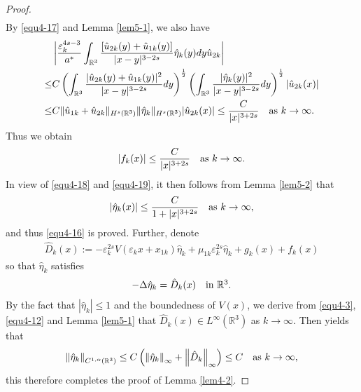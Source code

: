 \documentclass[reqno, 11pt]{amsart} %
\numberwithin{equation}{section}
\begin{document}
\begin{proof}
\begin{equation*}
\begin{split}
			\end{split}
		\end{equation*}
		By \eqref{equ4-17} and Lemma \ref{lem5-1}, we also have
		\begin{equation*}
			\begin{split}
				&	\left| \frac{\varepsilon_{k}^{4s-3}}{a^{\ast}}\int_{\mathbb{R}^{3}}\frac{[\hat{u}_{2k}(y)+\hat{u}_{1k}(y)]}{|x-y|^{3-2s}}\hat{\eta}_{k}(y)dy\hat{u}_{2k}\right| \\
				\leq&C\left(\int_{\mathbb{R}^{3}}\frac{|\hat{u}_{2k}(y)+\hat{u}_{1k}(y)|^{2}}{|x-y|^{3-2s}}dy \right)^{\frac{1}{2}}\left(\int_{\mathbb{R}^{3}}\frac{|\hat{\eta}_{k}(y)|^{2}}{|x-y|^{3-2s}}dy \right)^{\frac{1}{2}}|\hat{u}_{2k}(x)|	\\
				\leq&C\|\hat{u}_{1k}+\hat{u}_{2k}\|_{H^{s}(\mathbb{R}^{3})}\|\hat{\eta}_{k}\|_{H^{s}(\mathbb{R}^{3})}|\hat{u}_{2k}(x)|\leq \frac{C}{|x|^{3+2s}}\quad \hbox{as $k\rightarrow\infty$}.
			\end{split}
		\end{equation*}
		Thus we obtain
		\begin{equation}\label{equ4-19}
			|f_{k}(x)|\leq \frac{C}{|x|^{3+2s}}\quad \hbox{as $k\rightarrow\infty$}.
		\end{equation}
		In view of \eqref{equ4-18} and \eqref{equ4-19}, it then follows from Lemma \ref{lem5-2} that
		\begin{equation*}
			|\hat{\eta}_{k}(x)|\leq\frac{C}{1+|x|^{3+2s}}\quad \hbox{as $k\rightarrow\infty$},
		\end{equation*}
		and thus  \eqref{equ4-16} is proved. Further, denote
		\begin{align*} 
			\hat{D}_{k}(x):=-\varepsilon_{k}^{2s}V(\varepsilon_{k}x+x_{1k})\hat{\eta}_{k}+\mu_{1k}\varepsilon_{k}^{2s}\hat{\eta}_{k}+g_{k}(x)+f_{k}(x) 
		\end{align*}
		so that $\hat{\eta}_{k}$ satisfies
		\begin{align*} 
			-\Delta\hat{\eta}_{k}=\hat{D}_{k}(x)\quad \hbox{in $\mathbb{R}^{3}$}.
		\end{align*}
		By the fact that $|\hat{\eta}_{k}|\leq1$ and the boundedness of $V(x)$, we derive from \eqref{equ4-3}, \eqref{equ4-12} and Lemma \ref{lem5-1} that $\hat{D}_{k}(x)\in L^{\infty}(\mathbb{R}^{3})$ as $k\rightarrow\infty$. Then \cite[Proposition 2.9]{SS} yields that
		\begin{equation*}
			\left\|\hat{\eta}_{k} \right\| _{C^{1, \alpha}(\mathbb{R}^{3})}\leq C\left( \left\|\hat{\eta}_{k} \right\| _{\infty}+\left\|\hat{D}_{k} \right\| _{\infty}\right) \leq C\quad \hbox{as $k\rightarrow\infty$},
		\end{equation*}
		this therefore completes the proof of Lemma \ref{lem4-2}.
	\end{proof}
	
\end{document}
